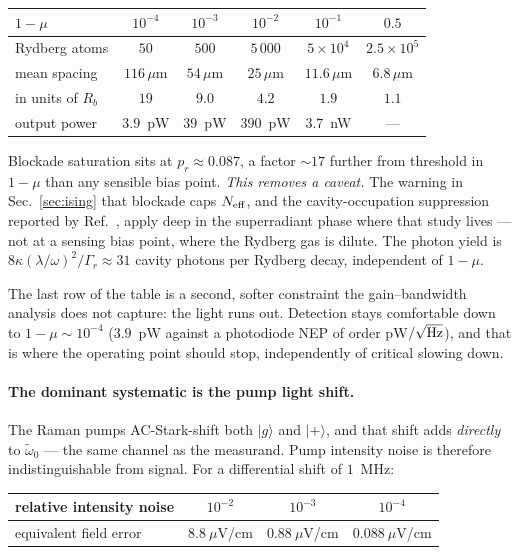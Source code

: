 \documentclass[11pt,a4paper]{article}
\newcommand{\wt}{\tilde{\omega}_{0}}
\newcommand{\ket}[1]{\lvert #1 \rangle}
\begin{document}
\begin{table}[h]
\centering\small
\begin{tabular}{lccccc}
\toprule
$1-\mu$ & $10^{-4}$ & $10^{-3}$ & $10^{-2}$ & $10^{-1}$ & $0.5$\\
\midrule
Rydberg atoms & $50$ & $500$ & $5\,000$ & $5\times10^4$ & $2.5\times10^5$\\
mean spacing & $116\,\mu$m & $54\,\mu$m & $25\,\mu$m & $11.6\,\mu$m & $6.8\,\mu$m\\
in units of $R_b$ & $19$ & $9.0$ & $4.2$ & $1.9$ & $1.1$\\
output power & $3.9$~pW & $39$~pW & $390$~pW & $3.7$~nW & --- \\
\bottomrule
\end{tabular}
\end{table}

\noindent Blockade saturation sits at $p_r\approx0.087$, a factor ${\sim}17$ further from
threshold in $1-\mu$ than any sensible bias point. \emph{This removes a caveat.} The warning
in Sec.~\ref{sec:ising} that blockade caps $N_{\rm eff}$, and the cavity-occupation
suppression reported by Ref.~\cite{DickeIsing2025}, apply deep in the superradiant phase
where that study lives --- not at a sensing bias point, where the Rydberg gas is dilute. The
photon yield is $8\kappa(\lambda/\omega)^2/\Gamma_r\approx31$ cavity photons per Rydberg
decay, independent of $1-\mu$.

The last row of the table is a second, softer constraint the gain--bandwidth analysis does
not capture: the light runs out. Detection stays comfortable down to $1-\mu\sim10^{-4}$
($3.9$~pW against a photodiode NEP of order pW$/\sqrt{\rm Hz}$), and that is where the
operating point should stop, independently of critical slowing down.

\paragraph{The dominant systematic is the pump light shift.} The Raman pumps AC-Stark-shift
both $\ket{g}$ and $\ket{+}$, and that shift adds \emph{directly} to $\wt$ --- the same
channel as the measurand. Pump intensity noise is therefore indistinguishable from signal.
For a differential shift of $1$~MHz:

\begin{center}\small
\begin{tabular}{lccc}
\toprule
relative intensity noise & $10^{-2}$ & $10^{-3}$ & $10^{-4}$\\
\midrule
equivalent field error & $8.8~\mu$V/cm & $0.88~\mu$V/cm & $0.088~\mu$V/cm\\
\bottomrule
\end{tabular}
\end{center}
\end{document}
